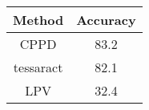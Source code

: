 

\begin{table}[ht]
  \centering
  \begin{tabular}{cc}
      \hline
      Method & Accuracy \\
      \hline
      CPPD      & 83.2     \\
      tessaract & 82.1     \\
      LPV       & 32.4 \\
      \hline
  \end{tabular}
\end{table}
